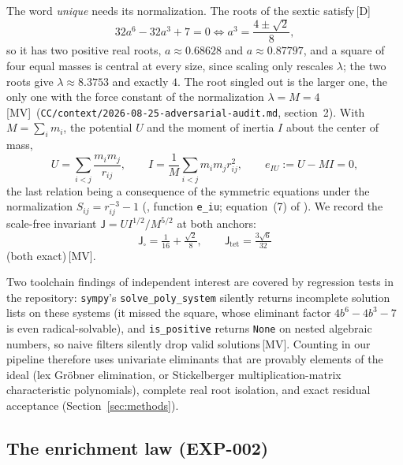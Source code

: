 \documentclass[11pt]{article}
\theoremstyle{definition}
\theoremstyle{remark}
\newcommand{\mk}[1]{\,{\scriptsize[#1]}}
\newcommand{\MV}{\mk{MV}}
\newcommand{\Dm}{\mk{D}}
\begin{document}
The word \emph{unique} needs its normalization. The roots of the sextic satisfy\Dm
\begin{equation}\label{eq:rhombus}
32a^6-32a^3+7=0\iff a^3=\frac{4\pm\sqrt2}{8},
\end{equation}
so it has two positive real
roots, $a\approx0.68628$ and $a\approx0.87797$, and a square of four equal masses is central at every
size, since scaling only rescales $\lambda$; the two roots give $\lambda\approx8.3753$ and
exactly $4$. The root singled out is the larger one, the only one with the force constant of the
normalization $\lambda=M=4$\MV\ (\texttt{CC/context/2026-08-25-adversarial-audit.md}, section~2). %
With $M=\sum_i m_i$, the potential $U$ and the moment of inertia $I$ about the center of mass,
\begin{equation}\label{eq:eiu}
U=\sum_{i<j}\frac{m_im_j}{r_{ij}},\qquad I=\frac1M\sum_{i<j}m_im_jr_{ij}^2,\qquad e_{IU}:=U-MI=0,
\end{equation}
the last relation being a consequence of the symmetric equations under the normalization $S_{ij}=r_{ij}^{-3}-1$
(, function \texttt{e\_iu}; equation~(7) of \cite{HJ11}). %
We record the scale-free invariant $\mathsf J=UI^{1/2}/M^{5/2}$ at both anchors:
\begin{equation}\label{eq:J}
\mathsf J_{\square}=\tfrac1{16}+\tfrac{\sqrt2}{8},\qquad \mathsf J_{\mathrm{tet}}=\tfrac{3\sqrt6}{32}
\end{equation}
(both exact)\MV.

Two toolchain findings of independent interest are covered by regression tests
in the repository: \texttt{sympy}'s
\texttt{solve\_poly\_system} silently returns incomplete solution lists on
these systems (it missed the square, whose eliminant factor $4b^6-4b^3-7$ is
even radical-solvable), and \texttt{is\_positive} returns \texttt{None} on
nested algebraic numbers, so naive filters silently drop valid solutions\MV.
Counting in our pipeline therefore uses univariate eliminants
that are provably elements of the ideal (lex Gr\"obner elimination, or
Stickelberger multiplication-matrix characteristic polynomials), complete real
root isolation, and exact residual acceptance (Section~\ref{sec:methods}).

\subsection{The enrichment law (EXP-002)}\label{sec:enrich}
\end{document}
